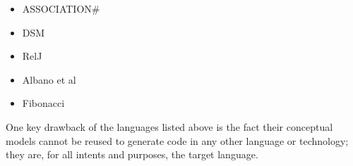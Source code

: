 \begin{itemize}
\item ASSOCIATION\#
\item DSM
\item RelJ
\item Albano et al
\item Fibonacci
\end{itemize}

One key drawback of the languages listed above is the fact their conceptual models
cannot be reused to generate code in any other language or technology;
they are, for all intents and purposes, the target language.
